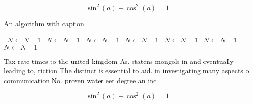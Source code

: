 \documentclass[a4paper]{article}
\begin{document}
\[ \sin^2(a)+\cos^2(a) = 1 \]

\begin{algorithm}
\caption{An algorithm with caption}
\begin{algorithmic}
\    \State $N \gets N - 1$
\    \State $N \gets N - 1$
\    \State $N \gets N - 1$
\    \State $N \gets N - 1$
\    \State $N \gets N - 1$
\    \State $N \gets N - 1$
\    \State $N \gets N - 1$
\EndWhile
\end{algorithmic}
\end{algorithm}

Tax rate times to the united kingdom As. statens mongols in and eventually leading to, riction The distinct is essential to aid. in investigating many aspects o communication No. proven water eet degree an inc

\[ \sin^2(a)+\cos^2(a) = 1 \]
\end{document}
